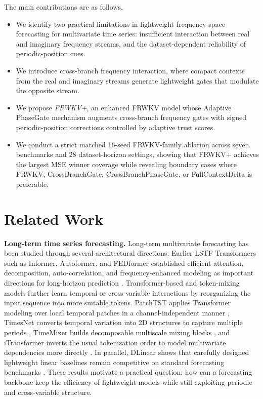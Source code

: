 \documentclass[a4paper,fleqn]{cas-sc}
\begin{document}
The main contributions are as follows.
\begin{itemize}
    \item We identify two practical limitations in lightweight frequency-space forecasting for multivariate time series: insufficient interaction between real and imaginary frequency streams, and the dataset-dependent reliability of periodic-position cues.
    \item We introduce cross-branch frequency interaction, where compact contexts from the real and imaginary streams generate lightweight gates that modulate the opposite stream.
    \item We propose \textit{FRWKV+}, an enhanced FRWKV model whose Adaptive PhaseGate mechanism augments cross-branch frequency gates with signed periodic-position corrections controlled by adaptive trust scores.
    \item We conduct a strict matched 16-seed FRWKV-family ablation across seven benchmarks and 28 dataset-horizon settings, showing that FRWKV+ achieves the largest MSE winner coverage while revealing boundary cases where FRWKV, CrossBranchGate, CrossBranchPhaseGate, or FullContextDelta is preferable.
\end{itemize}

\section{Related Work}
\textbf{Long-term time series forecasting.}
Long-term multivariate forecasting has been studied through several architectural directions. Earlier LSTF Transformers such as Informer, Autoformer, and FEDformer established efficient attention, decomposition, auto-correlation, and frequency-enhanced modeling as important directions for long-horizon prediction \cite{zhou2021informer,wu2021autoformer,zhou2022fedformer}. Transformer-based and token-mixing models further learn temporal or cross-variable interactions by reorganizing the input sequence into more suitable tokens. PatchTST applies Transformer modeling over local temporal patches in a channel-independent manner \cite{nie2023patchtst}, TimesNet converts temporal variation into 2D structures to capture multiple periods \cite{wu2023timesnet}, TimeMixer builds decomposable multiscale mixing blocks \cite{wang2024timemixer}, and iTransformer inverts the usual tokenization order to model multivariate dependencies more directly \cite{liu2024itransformer}. In parallel, DLinear shows that carefully designed lightweight linear baselines remain competitive on standard forecasting benchmarks \cite{zeng2023dlinear}. These results motivate a practical question: how can a forecasting backbone keep the efficiency of lightweight models while still exploiting periodic and cross-variable structure.
\end{document}
